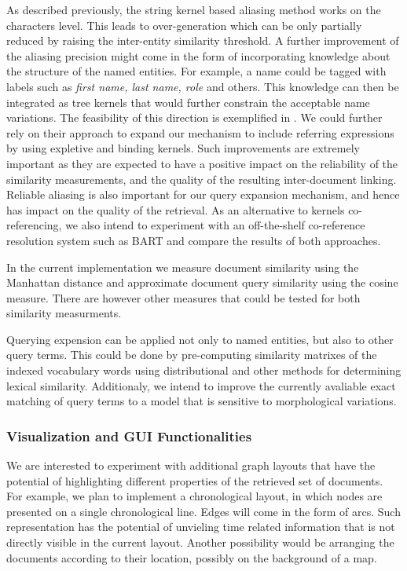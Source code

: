 As described previously, the string kernel based aliasing method works on the characters level. 
This leads to over-generation which can be only partially reduced by raising the inter-entity similarity threshold.   
A further improvement of the aliasing precision might come in the form of incorporating knowledge about the structure of the named entities. 
For example, a name could be tagged
with labels such as \emph{first name, last name, role} and others. This knowledge can then be integrated as tree kernels
that would further constrain the acceptable name variations. The feasibility of this direction is exemplified in \cite{string_kernel_coref}.
We could further rely on their approach to expand our mechanism to include referring expressions by using expletive and binding kernels.
Such improvements are extremely important as they are expected to have a positive impact on the reliability of the similarity measurements, and
the quality of the resulting inter-document linking. 
Reliable aliasing is also important for our query expansion mechanism, and hence has impact on the quality of the retrieval.
As an alternative to kernels co-referencing, we also intend to experiment with an off-the-shelf co-reference resolution system such as 
BART and compare the results of both approaches. 

In the current implementation we measure document similarity using the Manhattan distance and approximate document query similarity 
using the cosine measure. There are however other measures that could be tested for both similarity measurments. 

Querying expension can be applied not only to named entities, but also to other query terms. This could be done by pre-computing similarity matrixes
of the indexed vocabulary words using distributional and other methods for determining lexical similarity. Additionaly, we intend to improve
the currently avaliable exact matching of query terms to a model that is sensitive to morphological variations.


\subsubsection{Visualization and GUI Functionalities}

We are interested to experiment with additional graph layouts that have the potential of highlighting different properties of the 
retrieved set of documents. For example, we plan to implement a chronological layout, in which nodes are presented on a single chronological 
line. Edges will come in the form of arcs. Such representation has the potential of unvieling time related information that is not 
directly visible in the current layout. Another possibility would be arranging the documents according to their location, possibly on the background
of a map. 

